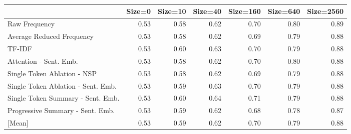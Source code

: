 \begin{tabular}{lrrrrrr}
\toprule
 & Size=0 & Size=10 & Size=40 & Size=160 & Size=640 & Size=2560 \\
\midrule
Raw Frequency & \cellcolor[RGB]{58,76,192}0.53 & \cellcolor[RGB]{101,134,236}0.58 & \cellcolor[RGB]{139,174,253}0.62 & \cellcolor[RGB]{213,219,229}0.70 & \cellcolor[RGB]{243,152,121}0.80 & \cellcolor[RGB]{179,3,38}0.89 \\
Average Reduced Frequency & \cellcolor[RGB]{58,76,192}0.53 & \cellcolor[RGB]{101,134,236}0.58 & \cellcolor[RGB]{139,174,253}0.62 & \cellcolor[RGB]{205,217,236}0.69 & \cellcolor[RGB]{246,164,134}0.79 & \cellcolor[RGB]{190,35,45}0.88 \\
TF-IDF & \cellcolor[RGB]{58,76,192}0.53 & \cellcolor[RGB]{120,155,247}0.60 & \cellcolor[RGB]{151,184,254}0.63 & \cellcolor[RGB]{213,219,229}0.70 & \cellcolor[RGB]{246,164,134}0.79 & \cellcolor[RGB]{190,35,45}0.88 \\
Attention - Sent. Emb. & \cellcolor[RGB]{58,76,192}0.53 & \cellcolor[RGB]{101,134,236}0.58 & \cellcolor[RGB]{139,174,253}0.62 & \cellcolor[RGB]{213,219,229}0.70 & \cellcolor[RGB]{243,152,121}0.80 & \cellcolor[RGB]{190,35,45}0.88 \\
Single Token Ablation - NSP & \cellcolor[RGB]{58,76,192}0.53 & \cellcolor[RGB]{101,134,236}0.58 & \cellcolor[RGB]{139,174,253}0.62 & \cellcolor[RGB]{205,217,236}0.69 & \cellcolor[RGB]{246,164,134}0.79 & \cellcolor[RGB]{190,35,45}0.88 \\
Single Token Ablation - Sent. Emb. & \cellcolor[RGB]{58,76,192}0.53 & \cellcolor[RGB]{111,145,242}0.59 & \cellcolor[RGB]{151,184,254}0.63 & \cellcolor[RGB]{213,219,229}0.70 & \cellcolor[RGB]{246,164,134}0.79 & \cellcolor[RGB]{190,35,45}0.88 \\
Single Token Summary - Sent. Emb. & \cellcolor[RGB]{58,76,192}0.53 & \cellcolor[RGB]{120,155,247}0.60 & \cellcolor[RGB]{160,191,254}0.64 & \cellcolor[RGB]{220,220,221}0.71 & \cellcolor[RGB]{246,164,134}0.79 & \cellcolor[RGB]{190,35,45}0.88 \\
Progressive Summary - Sent. Emb. & \cellcolor[RGB]{58,76,192}0.53 & \cellcolor[RGB]{111,145,242}0.59 & \cellcolor[RGB]{139,174,253}0.62 & \cellcolor[RGB]{197,213,242}0.68 & \cellcolor[RGB]{247,174,145}0.78 & \cellcolor[RGB]{200,56,53}0.87 \\
\midrule
{[Mean]} & \cellcolor[RGB]{58,76,192}0.53 & \cellcolor[RGB]{108,142,241}0.59 & \cellcolor[RGB]{145,179,254}0.62 & \cellcolor[RGB]{210,218,231}0.70 & \cellcolor[RGB]{246,163,132}0.79 & \cellcolor[RGB]{190,35,45}0.88 \\
\bottomrule
\end{tabular}
